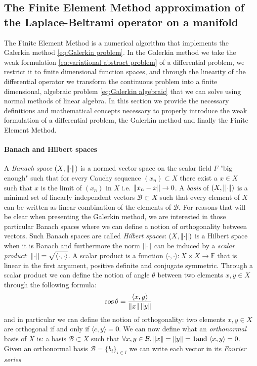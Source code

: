 \subsection{The Finite Element Method approximation of the Laplace-Beltrami operator on a manifold}\label{sec:Chapter3: Using the Finite Element Method to approximate the Laplace-Beltrami operator on a manifold}
The Finite Element Method is a numerical algorithm that implements the Galerkin method \ref{eq:Galerkin problem}. In the Galerkin method we take the weak formulation \ref{eq:variational abstract problem} of a differential problem, we restrict it to finite dimensional function spaces, and through the linearity of the differential operator we transform the continuous problem into a finite dimensional, algebraic problem \ref{eq:Galerkin algebraic} that we can solve using normal methods of linear algebra. In this section we provide the necessary definitions and mathematical concepts necessary to properly introduce the weak formulation of a differential problem, the Galerkin method and finally the Finite Element Method.\\
\paragraph{Banach and Hilbert spaces}
A \textit{Banach space} $(X, \left\lVert\cdot\right\rVert)$ is a normed vector space on the scalar field $F$ "big enough" such that for every Cauchy sequence $(x_n)\subset X$ there exist a $x\in X$ such that $x$ is the limit of $(x_n)$ in $X$ i.e. $\left\lVert x_n-x\right\rVert\rightarrow 0$. A \textit{basis} of $(X, \left\lVert\cdot\right\rVert)$ is a minimal set of linearly independent vectors $\mathcal B \subset X$ such that every element of $X$ can be written as linear combination of the elements of $\mathcal B$. For reasons that will be clear when presenting the Galerkin method, we are interested in those particular Banach spaces where we can define a notion of orthogonality between vectors. Such Banach spaces are called \textit{Hilbert spaces}: $(X, \left\lVert\cdot\right\rVert )$ is a Hilbert space when it is Banach and furthermore the norm $ \left\lVert\cdot\right\rVert $ can be induced by a \textit{scalar product}: $\left\lVert\cdot\right\rVert = \sqrt{\langle\cdot,\cdot\rangle}$. A scalar product is a function $\langle\cdot,\cdot\rangle: X\times X \rightarrow \mathbb F$ that is linear in the first argument, positive definite and conjugate symmetric. Through a scalar product we can define the notion of angle $\theta$ between two elements $x, y \in X$ through the following formula: 
$$
\cos \theta = \frac{\langle x, y\rangle}{\left\lVert x\right\rVert \left\lVert y\right\rVert}
$$ 
and in particular we can define the notion of orthogonality: two elements  $x, y \in X$ are orthogonal if and only if $\langle c, y\rangle=0$. We can now define what an \textit{orthonormal} basis of $X$ is: a basis $\mathcal B \subset X$ such that $\forall x, y \in \mathcal B, \left\lVert x\right\rVert = \left\lVert y\right\rVert = 1 \text{and } \langle x, y\rangle = 0$. Given an orthonormal basis $\mathcal B = \{b_i\}_{i\in I}$ we can write each vector in its \textit{Fourier series} 

